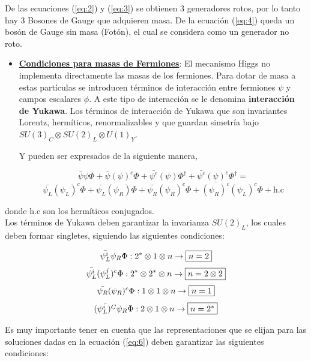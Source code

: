 \documentclass[12pt]{article}
\begin{document}
\begin{enumerate}
De las ecuaciones (\ref{eq:2}) y (\ref{eq:3}) se obtienen 3 generadores rotos, por lo tanto hay 3 Bosones de Gauge que adquieren masa. De la ecuación (\ref{eq:4}) queda un bosón de Gauge sin masa (Fotón), el cual se considera como un generador no roto. \\ 


\begin{itemize}
\item \underline{ \textbf{Condiciones para masas de Fermiones}}: El mecanismo Higgs no implementa directamente las masas de los fermiones. Para dotar de masa a estas partículas se introducen términos de interacción entre fermiones \(\psi\) y campos escalares \(\phi\). A este tipo de
interacción se le denomina \textbf{interacción de Yukawa}. Los términos de
interacción de Yukawa que son invariantes Lorentz, hermíticos, renormalizables y que guardan simetría bajo \(SU(3)_C \otimes SU(2)_L \otimes U(1)_Y \).

Y pueden ser expresados de la siguiente manera, 

\[\bar{\psi}\psi\Phi + \bar{\psi}(\psi)^{c}\Phi +  \bar{\psi^c}(\psi)\Phi^{\dagger} + \bar{\psi^c}(\psi)^c\Phi^{\dagger} = \]
\begin{equation}
    \bar{\psi_L}(\psi_L)^{c}\Phi + \bar{\psi_L}(\psi_R)\Phi  +  \bar{\psi_R}(\psi_R)^c\Phi + \bar{(\psi_R)^c}(\psi_L)^c\Phi + \text{h.c}  
    \label{eq:5}
\end{equation}
\end{itemize}

donde h.c son los hermíticos conjugados. \\

Los términos de Yukawa deben garantizar la invarianza \(SU(2)_L\), los cuales deben formar singletes, siguiendo las siguientes condiciones:

\[\bar{\psi_L^i}\psi_R\Phi : 2^*\otimes1 \otimes n \rightarrow \fbox{$n=2$}
 \]
\begin{equation}
\label{eq:21}
    \bar{{\psi}_L^i}({\psi}_L^j)^c\Phi : 2^* \otimes 2^*\otimes n \rightarrow \fbox{$n=2\otimes 2$} \end{equation}
\[\bar{\psi_R}(\psi_R)^c\Phi : 1\otimes 1\otimes n \rightarrow \fbox{$n=1 $}\]
\begin{equation}
\bar{(\psi_L^i)^C}\psi_R\Phi : 2\otimes1 \otimes n \rightarrow \fbox{$n= 2^*$}
\label{eq:6}
\end{equation}

Es muy importante tener en cuenta que las representaciones que se elijan para las soluciones dadas en la ecuación (\ref{eq:6}) deben garantizar las siguientes condiciones:


\end{enumerate}
\end{document}
